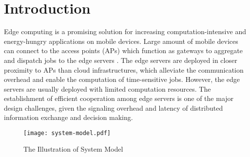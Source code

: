 \section{Introduction}
\label{sec:introduction}
Edge computing is a promising solution for increasing computation-intensive and energy-hungry applications on mobile devices.
Large amount of mobile devices can connect to the access points (APs) which function as gateways to aggregate and dispatch jobs to the edge servers \cite{MEC-SURVEY}.
The edge servers are deployed in closer proximity to APs than cloud infrastructures, which alleviate the communication overhead and enable the computation of time-sensitive jobs.
However, the edge servers are usually deployed with limited computation resources.
The establishment of efficient cooperation among edge servers is one of the major design challenges, given the signaling overhead and latency of distributed information exchange and decision making.

\begin{figure}[htp!]
    \centering
    \texttt{[image: system-model.pdf]}
    \caption{The Illustration of System Model}
    \label{fig:system}
\end{figure}

